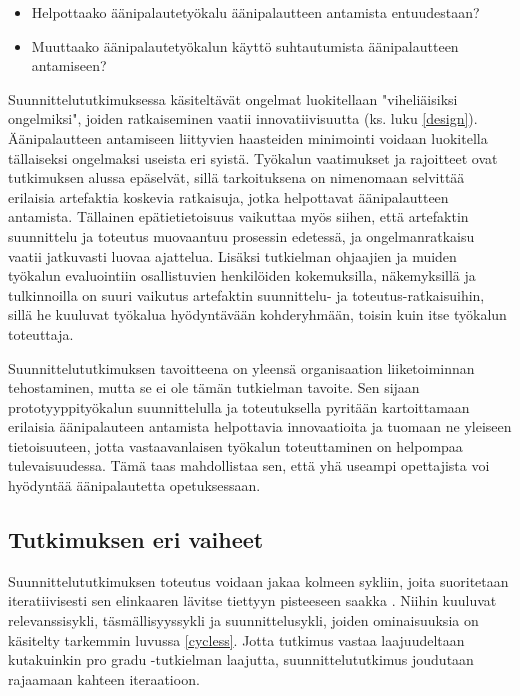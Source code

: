 \documentclass[utf8]{gradu3}
\begin{document}
\begin{itemize}
  \item Helpottaako äänipalautetyökalu äänipalautteen antamista entuudestaan?
  \item Muuttaako äänipalautetyökalun käyttö suhtautumista äänipalautteen antamiseen?
\end{itemize}

Suunnittelututkimuksessa käsiteltävät ongelmat luokitellaan "viheliäisiksi ongelmiksi", joiden ratkaiseminen vaatii innovatiivisuutta (ks. luku \ref{design}). Äänipalautteen antamiseen liittyvien haasteiden minimointi voidaan luokitella tällaiseksi ongelmaksi useista eri syistä. Työkalun vaatimukset ja rajoitteet ovat tutkimuksen alussa epäselvät, sillä tarkoituksena on nimenomaan selvittää erilaisia artefaktia koskevia ratkaisuja, jotka helpottavat äänipalautteen antamista. Tällainen epätietietoisuus vaikuttaa myös siihen, että artefaktin suunnittelu ja toteutus muovaantuu prosessin edetessä, ja ongelmanratkaisu vaatii jatkuvasti luovaa ajattelua. Lisäksi tutkielman ohjaajien ja muiden työkalun evaluointiin osallistuvien henkilöiden kokemuksilla, näkemyksillä ja tulkinnoilla on suuri vaikutus artefaktin suunnittelu- ja toteutus-ratkaisuihin, sillä he kuuluvat työkalua hyödyntävään kohderyhmään, toisin kuin itse työkalun toteuttaja.

Suunnittelututkimuksen tavoitteena on yleensä organisaation liiketoiminnan tehostaminen, mutta se ei ole tämän tutkielman tavoite. Sen sijaan prototyyppityökalun suunnittelulla ja toteutuksella pyritään kartoittamaan erilaisia äänipalauteen antamista helpottavia innovaatioita ja tuomaan ne yleiseen tietoisuuteen, jotta vastaavanlaisen työkalun toteuttaminen on helpompaa tulevaisuudessa. Tämä taas mahdollistaa sen, että yhä useampi opettajista voi hyödyntää äänipalautetta opetuksessaan.

\subsection{Tutkimuksen eri vaiheet}

Suunnittelututkimuksen toteutus voidaan jakaa kolmeen sykliin, joita suoritetaan iteratiivisesti sen elinkaaren lävitse tiettyyn pisteeseen saakka \parencite{cycles}. Niihin kuuluvat relevanssisykli, täsmällisyyssykli ja suunnittelusykli, joiden ominaisuuksia on käsitelty tarkemmin luvussa \ref{cycless}.  Jotta tutkimus vastaa laajuudeltaan kutakuinkin pro gradu -tutkielman laajutta, suunnittelututkimus joudutaan rajaamaan kahteen iteraatioon.
\end{document}

